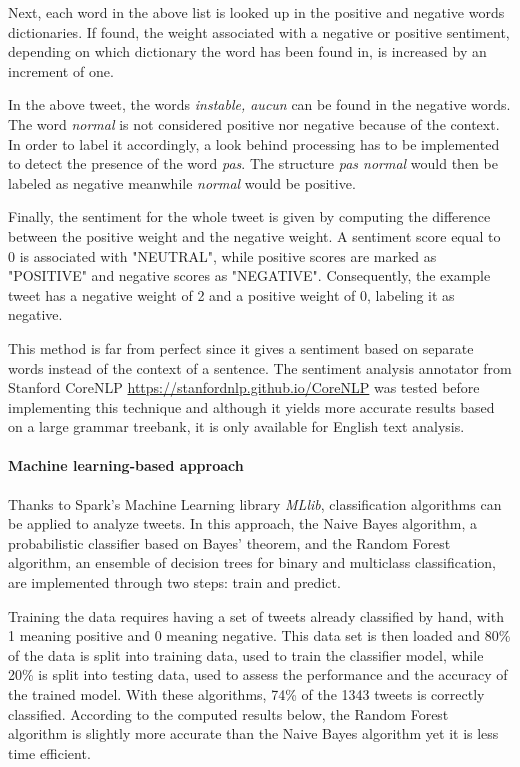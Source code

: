 \documentclass[11pt]{article}
\begin{document}
Next, each word in the above list is looked up in the positive and negative words dictionaries. If found, the weight associated with a negative or positive sentiment, depending on which dictionary the word has been found in, is increased by an increment of one.

In the above tweet, the words \textit{instable, aucun} can be found in the negative words. The word \textit{normal} is not considered positive nor negative because of the context. In order to label it accordingly, a look behind processing has to be implemented to detect the presence of the word \textit{pas}. The structure \textit{pas normal} would then be labeled as negative meanwhile \textit{normal} would be positive.

Finally, the sentiment for the whole tweet is given by computing the difference between the positive weight and the negative weight. A sentiment score equal to 0 is associated with "NEUTRAL", while positive scores are marked as "POSITIVE" and negative scores as "NEGATIVE". Consequently, the example tweet has a negative weight of 2 and a positive weight of 0, labeling it as negative.

This method is far from perfect since it gives a sentiment based on separate words instead of the context of a sentence. The sentiment analysis annotator from Stanford CoreNLP \url{https://stanfordnlp.github.io/CoreNLP} was tested before implementing this technique and although it yields more accurate results based on a large grammar treebank, it is only available for English text analysis.

\paragraph{Machine learning-based approach}


Thanks to Spark's Machine Learning library \textit{MLlib}, classification algorithms can be applied to analyze tweets. In this approach, the Naive Bayes algorithm, a probabilistic classifier based on Bayes' theorem, and the Random Forest algorithm, an ensemble of decision trees for binary and multiclass classification, are implemented through two steps: train and predict.

Training the data requires having a set of tweets already classified by hand, with 1 meaning positive and 0 meaning negative. This data set is then loaded and 80\% of the data is split into training data, used to train the classifier model, while 20\% is split into testing data, used to assess the performance and the accuracy of the trained model.
With these algorithms, 74\% of the 1343 tweets is correctly classified. According to the computed results below, the Random Forest algorithm is slightly more accurate than the Naive Bayes algorithm yet it is less time efficient. %
\end{document}

